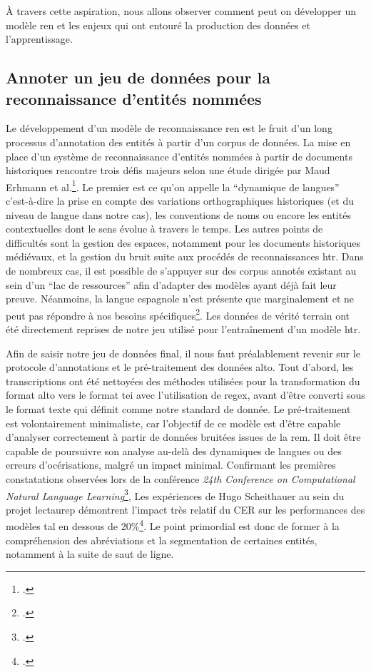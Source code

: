 	À travers cette aspiration, nous allons observer comment peut on développer un modèle \gls{ren} et les enjeux qui ont entouré la production des données et l'apprentissage.
    
    \subsection{Annoter un jeu de données pour la reconnaissance d'entités nommées}
    
    Le développement d'un modèle de reconnaissance \gls{ren} est le fruit d'un long processus d'annotation des entités à partir d'un corpus de données. La mise en place d'un système de reconnaissance d'entités nommées à partir de documents historiques rencontre trois défis majeurs selon une étude dirigée par Maud Erhmann et al.\footcite{ehrmannNamedEntityRecognition2021}. Le premier est ce qu'on appelle la \enquote{dynamique de langues} c'est-à-dire la prise en compte des variations orthographiques historiques (et du niveau de langue dans notre cas), les conventions de noms ou encore les entités contextuelles dont le sens évolue à travers le temps. Les autres points de difficultés sont la gestion des espaces, notamment pour les documents historiques médiévaux, et la gestion du bruit suite aux procédés de reconnaissances \gls{htr}. Dans de nombreux cas, il est possible de s'appuyer sur des corpus annotés existant au sein d'un \enquote{lac de ressources} afin d'adapter des modèles ayant déjà fait leur preuve. Néanmoins, la langue espagnole n'est présente que marginalement et ne peut pas répondre à nos besoins spécifiques\footcite[Seul un corpus de transcriptions médiévales espagnols et un jeu concernant des données bibliographiques multilingues ont été identifiés.][]{ehrmannNamedEntityRecognition2021}. Les données de vérité terrain ont été directement reprises de notre jeu utilisé pour l'entraînement d'un modèle \gls{htr}. 
    
    Afin de saisir notre jeu de données final, il nous faut préalablement revenir sur le protocole d'annotations et le pré-traitement des données \gls{alto}. Tout d'abord, les transcriptions ont été nettoyées des méthodes utilisées pour la transformation du format \gls{alto} vers le format \gls{tei} avec l'utilisation de \gls{regex}, avant d'être converti sous le format texte qui définit comme notre standard de donnée. Le pré-traitement est volontairement minimaliste, car l'objectif de ce modèle est d'être capable d'analyser correctement à partir de données bruitées issues de la \gls{rem}. Il doit être capable de poursuivre son analyse au-delà des dynamiques de langues ou des erreurs d'océrisations, malgré un impact minimal. Confirmant les premières constatations observées lors de la conférence \textit{24th Conference on Computational Natural Language Learning}\footcite{borosAlleviatingDigitizationErrors2020}, Les expériences de Hugo Scheithauer au sein du projet \gls{lectaurep} démontrent l'impact très relatif du \gls{CER} sur les performances des modèles \gls{tal} en dessous de 20\%\footcite[p.~102-104]{scheithauerReconnaissanceEntitesNommees2021}. Le point primordial est donc de former à la compréhension des abréviations et la segmentation de certaines entités, notamment à la suite de saut de ligne. \newpar
    
